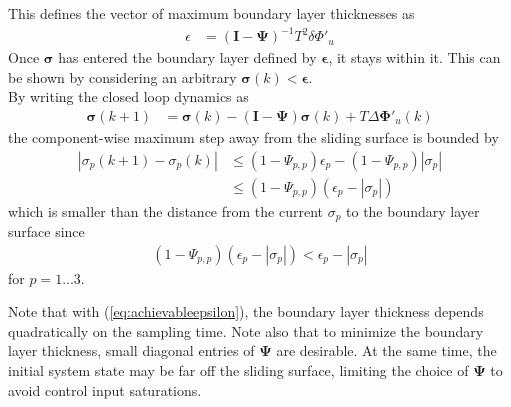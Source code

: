 \documentclass{ifacconf}
\providecommand{\mbf}[1]{\mathbf{#1}}
\newcommand{\idxSample}{{\ensuremath{k}}}
\newcommand{\idxAxis}{{\ensuremath{p}}}
\begin{document}
This defines the vector of maximum boundary layer thicknesses as
\begin{align}
\epsilon &=
(\mbf{I} - \mbf{\Psi})^{-1} T^2 \delta \Phi'_u
\label{eq:achievableepsilon}
\end{align}
Once $\mbf{\sigma}$ has entered the boundary layer defined by $\mbf{\epsilon}$, it stays within it. This can be shown by considering an arbitrary $\mbf{\sigma}(k) < \mbf{\epsilon}$.\\ 
By writing the closed loop dynamics as
\begin{align}
\mbf{\sigma}(\idxSample+1) &= 
\mbf{\sigma}
(
\idxSample) -
(\mbf{I} - \mbf{\Psi}) 
\mbf{\sigma}(k)
+
T \Delta \mbf{\Phi}'_u(\idxSample)
\end{align}
the component-wise maximum step away from the sliding surface is bounded by
\begin{align}
|{\sigma}_\idxAxis(\idxSample+1) - {\sigma}_\idxAxis(\idxSample)|
&\leq (1-\Psi_{\idxAxis, \idxAxis})\epsilon_\idxAxis - (1-\Psi_{\idxAxis, \idxAxis})|\sigma_\idxAxis| \\
&\leq (1-\Psi_{\idxAxis, \idxAxis})(\epsilon_\idxAxis - |\sigma_\idxAxis|)
\end{align}
which is smaller than the distance from the current ${\sigma_\idxAxis}$ to the boundary layer surface since
\begin{align}
(1-\Psi_{\idxAxis, \idxAxis})(\epsilon_\idxAxis - |\sigma_\idxAxis|) < \epsilon_\idxAxis - |\sigma_\idxAxis|
\end{align}
for $\idxAxis = 1...3$.

Note that with (\ref{eq:achievableepsilon}), the boundary layer thickness depends quadratically on the sampling time. Note also that to minimize the boundary layer thickness, small diagonal entries of $\mbf{\Psi}$ are desirable. At the same time, the initial system state may be far off the sliding surface, limiting the choice of $\mbf{\Psi}$ to avoid control input saturations. 
\end{document}
